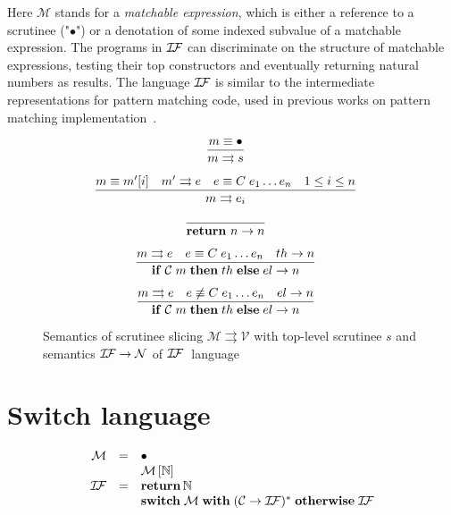  Here $\mathcal{M}$ stands for a \emph{matchable expression}, which is either a reference to a scrutinee ("$\bullet$") or
 a denotation of some indexed subvalue of a matchable expression. The programs in $\mathcal{I\!F}$ can discriminate on the
 structure of matchable expressions, testing their top constructors and eventually returning natural numbers as results.
 The language $\mathcal{I\!F}$ is similar to the intermediate representations for pattern matching code, used in 
 previous works on pattern matching implementation~\cite{maranget2001,maranget2008}.
 
 
 \begin{figure}
    \[
    \begin{array}{cr}
      \dfrac{m \equiv \bullet} { m \rightrightarrows s} & 
        \\[5mm]
      \dfrac{m \equiv m'[i]\quad m'\rightrightarrows e\quad e\equiv C\;e_1\dots e_n\quad 1\le i\le n} { m \rightrightarrows e_i} & 
        \\[5mm]
      \dfrac{}{\mathbf{return}\ n \rightarrow n} &       
        \\[5mm]
      \dfrac{m \rightrightarrows e \quad e\equiv C\; e_1\dots e_n\quad th \rightarrow n} {\mathbf{if}\;\mathcal{C}\;m \; \mathbf{then}\;th\;\mathbf{else}\;el \rightarrow n} &       
        \\[5mm]
      \dfrac{m \rightrightarrows e \quad e\not\equiv C\; e_1\dots e_n\quad el \rightarrow n} {\mathbf{if}\;\mathcal{C}\;m\;\mathbf{then}\;th\;\mathbf{else}\;el \rightarrow n} &       
    \end{array}
    \]
    \caption{Semantics of scrutinee slicing $\mathcal{M} \rightrightarrows \mathcal{V}$ with top-level scrutinee $s$ and semantics $\mathcal{I\!F}\rightarrow \mathcal{N}$  of $\mathcal{I\!F}\;$ language
    }
   \label{fig:ir}
 \end{figure}
 

\section{Switch language}

 \[
 \begin{array}{rcl}
   \mathcal M & = & \bullet \\
              &   & \mathcal M\,[\mathbb{N}] \\
   \mathcal{I\!F} & = & \mathbf{return}\,\mathbb{N} \\
              &   & \mathbf{switch}\;\mathcal{M}\;\mathbf{with}\; (\mathcal{C}\; \mathbf{\rightarrow}\; \mathcal{I\!F})^*\;\mathbf{otherwise}\;\mathcal{I\!F}
 \end{array}
 \]
 
